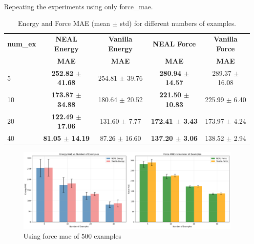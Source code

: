 \documentclass[12pt]{article}
\theoremstyle{definition}
\theoremstyle{remark}
\begin{document}
Repeating the experiments using only force\_mae.
\begin{table}[htbp]
\centering
\small
\caption{Energy and Force MAE (mean $\pm$ std) for different numbers of examples.}
\begin{tabular}{@{}lcccc@{}}
\hline
\textbf{num\_ex} & \textbf{NEAL Energy} & \textbf{Vanilla Energy} & \textbf{NEAL Force} & \textbf{Vanilla Force} \\
& \textbf{MAE} & \textbf{MAE} & \textbf{MAE} & \textbf{MAE} \\
\hline
5  & \textbf{252.82 $\pm$ 41.68} & 254.81 $\pm$ 39.76 & \textbf{280.94 $\pm$ 14.57} & 289.37 $\pm$ 16.08 \\
10 & \textbf{173.87 $\pm$ 34.88} & 180.64 $\pm$ 20.52 & \textbf{221.50 $\pm$ 10.83} & 225.99 $\pm$ 6.40 \\
20 & \textbf{122.49 $\pm$ 17.06} & 131.60 $\pm$ 7.77  & \textbf{172.41 $\pm$ 3.43}  & 173.97 $\pm$ 4.24 \\
40 & \textbf{81.05 $\pm$ 14.19}  & 87.26 $\pm$ 16.60  & \textbf{137.20 $\pm$ 3.06}  & 138.52 $\pm$ 2.94 \\
\hline
\end{tabular}
\end{table}


\newpage
\begin{figure}[htbp]
    \centering
    \includegraphics[width=1\linewidth]{plots/Validation using 500 examples using force mae only .png}
    \caption{Using force mae of 500 examples}
    \label{fig:placeholder}
\end{figure}
\end{document}
